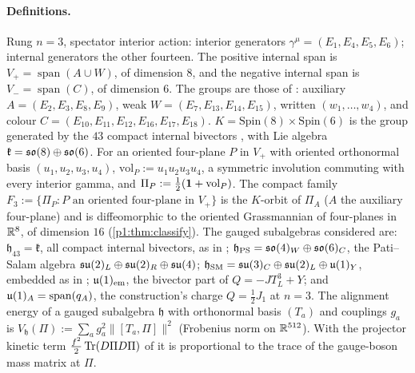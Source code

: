 \paragraph{Definitions.} Rung $n=3$, spectator interior action: interior generators $\gamma^\mu=(E_1,E_4,E_5,E_6)$; internal generators the other fourteen. The
positive internal span is $V_+=\operatorname{span}(A\cup W)$, of dimension $8$, and the negative internal span is $V_-=\operatorname{span}(C)$, of dimension $6$. The groups are those of \cite[Section~8]{ES17}: auxiliary $A=(E_2,E_3,E_8,E_9)$,
weak $W=(E_7,E_{13},E_{14},E_{15})$, written $(w_1,\dots,w_4)$, and colour $C=(E_{10},E_{11},E_{12},E_{16},E_{17},E_{18})$.
$K=\mathrm{Spin}(8)\times\mathrm{Spin}(6)$ is the group generated by the $43$ compact internal bivectors \cite[Thm.~2.3]{ES17}, with Lie algebra $\mathfrak k=\mathfrak{so}(8)\oplus\mathfrak{so}(6)$. For an
oriented four-plane $P$ in $V_+$ with oriented orthonormal basis $(u_1,u_2,u_3,u_4)$, $\mathrm{vol}_P:=u_1u_2u_3u_4$, a symmetric involution commuting with every interior
gamma, and $\Pi_P:=\tfrac12(\mathbf 1+\mathrm{vol}_P)$. The compact family $F_3:=\{\Pi_P:P\text{ an oriented four-plane in }V_+\}$ is the $K$-orbit of $\Pi_A$ ($A$ the
auxiliary four-plane) and is diffeomorphic to the oriented Grassmannian of four-planes in $\mathbb{R}^8$, of dimension $16$ (\cref{p1:thm:classify}). The gauged subalgebras considered
are: $\mathfrak h_{43}=\mathfrak k$, all compact internal bivectors, as in \cite[Prop.~21.6]{ES17}; $\mathfrak h_{\rm PS}=\mathfrak{so}(4)_W\oplus\mathfrak{so}(6)_C$, the Pati--Salam algebra
$\mathfrak{su}(2)_L\oplus\mathfrak{su}(2)_R\oplus\mathfrak{su}(4)$; $\mathfrak h_{\rm SM}=\mathfrak{su}(3)_C\oplus\mathfrak{su}(2)_L\oplus\mathfrak{u}(1)_Y$, embedded as in \cite[Section~8]{ES17}; $\mathfrak{u}(1)_{\rm em}$, the bivector part of
$Q=-JT^3_L+Y$; and $\mathfrak{u}(1)_A=\operatorname{span}(q_A)$, the construction's charge $Q=\tfrac12J_1$ at $n=3$. The alignment energy of a gauged subalgebra $\mathfrak h$ with
orthonormal basis $(T_a)$ and couplings $g_a$ is $V_{\mathfrak h}(\Pi):=\sum_ag_a^2\|[T_a,\Pi]\|^2$ (Frobenius norm on $\mathbb{R}^{512}$). With the projector kinetic term
$\tfrac{f^2}2\operatorname{Tr}(D\Pi D\Pi)$ of \cite[Section~26]{ES17} it is proportional to the trace of the gauge-boson mass matrix at $\Pi$.


